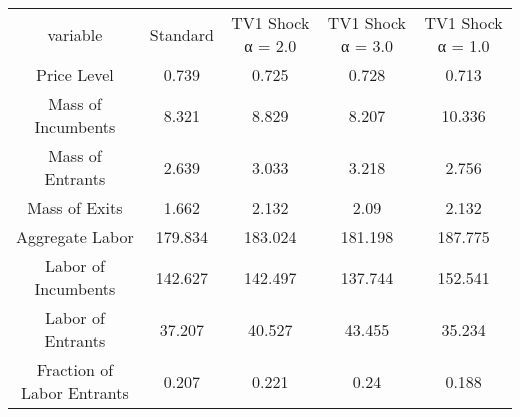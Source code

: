 \begin{tabular}{ccccc}
variable & Standard & TV1 Shock α = 2.0 & TV1 Shock α = 3.0 & TV1 Shock α = 1.0\\
Price Level & 0.739 & 0.725 & 0.728 & 0.713\\
Mass of Incumbents & 8.321 & 8.829 & 8.207 & 10.336\\
Mass of Entrants & 2.639 & 3.033 & 3.218 & 2.756\\
Mass of Exits & 1.662 & 2.132 & 2.09 & 2.132\\
Aggregate Labor & 179.834 & 183.024 & 181.198 & 187.775\\
Labor of Incumbents & 142.627 & 142.497 & 137.744 & 152.541\\
Labor of Entrants & 37.207 & 40.527 & 43.455 & 35.234\\
Fraction of Labor Entrants & 0.207 & 0.221 & 0.24 & 0.188\\
\end{tabular}
